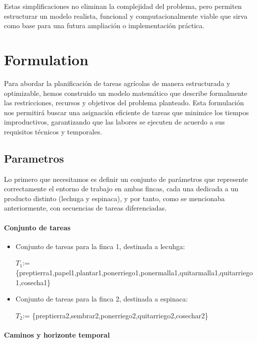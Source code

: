 Estas simplificaciones no eliminan la complejidad del problema, pero permiten estructurar un modelo realista, funcional y computacionalmente viable que sirva como base para una futura ampliación o implementación práctica.






\chapter*{Formulation}

Para abordar la planificación de tareas agrícolas de manera estructurada y optimizable, hemos construido un modelo matemático que describe formalmente las restricciones, recursos y objetivos del problema planteado.
Esta formulación nos permitirá buscar una asignación eficiente de tareas que minimice los tiempos improductivos, garantizando que las labores se ejecuten de acuerdo a sus requisitos técnicos y temporales.

\section*{Parametros}
Lo primero que necesitamos es definir un conjunto de parámetros que represente correctamente el entorno de trabajo en ambas fincas, cada una dedicada a un producto distinto (lechuga y espinaca),
y por tanto, como se mencionaba anteriormente, con secuencias de tareas diferenciadas.


\subsubsection{Conjunto de tareas}
\begin{itemize}
    \item Conjunto de tareas para la finca 1, destinada a lecuhga:
    
    $T_1$:= \{preptierra1,papel1,plantar1,ponerriego1,ponermalla1,quitarmalla1,quitarriego1,cosecha1\}
    \item Conjunto de tareas para la finca 2, destinada a espinaca:
    
    $T_2$:= \{preptierra2,sembrar2,ponerriego2,quitarriego2,cosechar2\}
\end{itemize}

\subsubsection{Caminos y horizonte temporal}


